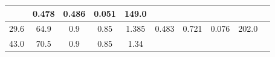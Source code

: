 \documentclass[a4paper,12pt]{article}
\begin{document}
\begin{longtable}{
     |
%    
    c|
%    
    c|
%    
    c|
%    
    c|
%    
    c|
%    
    c|
%    
    c|
%    
    c|
%    
    c|
%    
    c|
%    
    }
%        
        & 0.478
%        

%        

%        
        & 0.486
%        

%        

%        
        & 0.051
%        

%        

%        
        & 149.0
%        

%        
        \\
        \hline

        

%        

%        
        29.6
%        

%        

%        
        & 64.9
%        

%        

%        
        & 0.9
%        

%        

%        
        & 0.85
%        

%        

%        
        & 1.385
%        

%        

%        
        & 0.483
%        

%        

%        
        & 0.721
%        

%        

%        
        & 0.076
%        

%        

%        
        & 202.0
%        

%        
        \\
        \hline

        

%        

%        
        43.0
%        

%        

%        
        & 70.5
%        

%        

%        
        & 0.9
%        

%        

%        
        & 0.85
%        

%        

%        
        & 1.34
%        

%        


\end{longtable}
\end{document}
